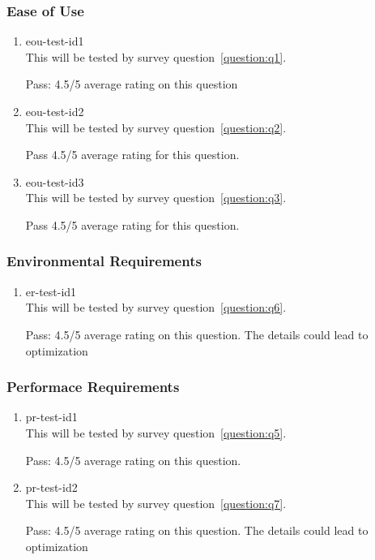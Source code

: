\documentclass[12pt, titlepage]{article}
\begin{document}
\subsubsection{Ease of Use}

\begin{enumerate}

\item{eou-test-id1\\}
This will be tested by survey question~\ref{question:q1}.

Pass: 4.5/5 average rating on this question
\item{eou-test-id2\\}
This will be tested by survey question~\ref{question:q2}.

Pass 4.5/5 average rating for this question.
\item{eou-test-id3\\}
This will be tested by survey question~\ref{question:q3}.

Pass 4.5/5 average rating for this question.
\end{enumerate}

\subsubsection{Environmental Requirements}

\begin{enumerate}

\item{er-test-id1\\}
This will be tested by survey question~\ref{question:q6}.

Pass: 4.5/5 average rating on this question. The details could lead to optimization
\end{enumerate}

\subsubsection{Performace Requirements}

\begin{enumerate}

\item{pr-test-id1\\}
This will be tested by survey question~\ref{question:q5}.

Pass: 4.5/5 average rating on this question.
\item{pr-test-id2\\}
This will be tested by survey question~\ref{question:q7}.

Pass: 4.5/5 average rating on this question. The details could lead to optimization
\end{enumerate}
\end{document}
